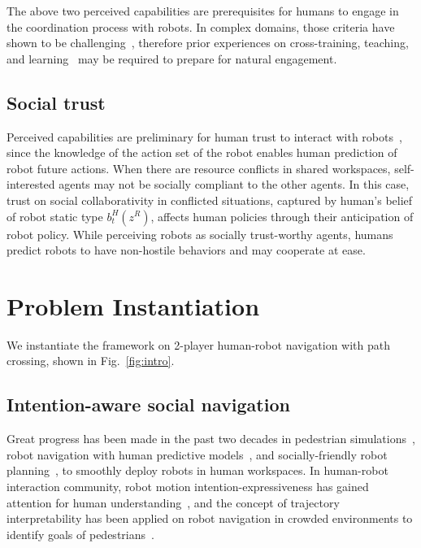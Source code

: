 \documentclass[letterpaper, 10 pt, conference]{ieeeconf}  %
\begin{document}
The above two perceived capabilities are prerequisites for humans to engage in the 
coordination process with robots. In complex domains, those criteria have shown to be 
challenging~\cite{knepper2017implicit}, therefore prior experiences on 
cross-training, teaching, and learning~\cite{zhang2017plan} may be required 
to prepare for natural engagement. 
\vspace{-.2em}
\subsection{Social trust}%
\vspace{-.2em}
Perceived capabilities are preliminary for human trust to interact with 
robots~\cite{yang2017evaluating}, since the knowledge of the action set of the robot enables 
human prediction of robot future actions.
When there are resource conflicts in shared workspaces, 
self-interested agents may not be socially compliant to the other agents. 
In this case, trust on social collaborativity in conflicted situations, 
captured by human's belief of robot static type $b^H_t(z^R)$, 
affects human policies through their anticipation of robot policy. While 
perceiving robots as socially 
trust-worthy agents, humans predict robots to have non-hostile behaviors and 
may cooperate at ease.   

\section{Problem Instantiation}
We instantiate the framework on 2-player human-robot navigation with path 
crossing, shown in Fig.~\ref{fig:intro}.

\vspace{-.2em}
\subsection{Intention-aware social navigation}
\vspace{-.2em}
Great progress has been made in the past two decades in pedestrian simulations~\cite{karamouzas2009predictive,zanlungo2011social}, robot navigation with human predictive models~\cite{trautman2010unfreezing,kuderer2012feature}, and 
socially-friendly robot 
planning~\cite{mavrogiannis2016decentralized,chen2017socially}, to smoothly 
deploy robots in human workspaces. In human-robot interaction community, 
robot motion intention-expressiveness has gained attention for human 
understanding~\cite{dragan2013legibility}, and the concept of trajectory 
interpretability has been applied on robot navigation in crowded 
environments to identify goals of pedestrians~\cite{bai2015intention,unhelkar2015human}. 
\end{document}
